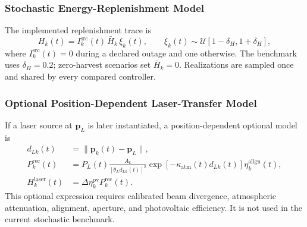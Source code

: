 \subsubsection{Stochastic Energy-Replenishment Model}
The implemented replenishment trace is
\begin{equation}
H_k(t)=I_k^{\mathrm{src}}(t)\,\bar H_k\,\xi_k(t),\qquad
\xi_k(t)\sim\mathcal U[1-\delta_H,1+\delta_H],
\label{eq:stochastic_harvest}
\end{equation}
where $I_k^{\mathrm{src}}(t)=0$ during a declared outage and one
otherwise. The benchmark uses $\delta_H=0.2$; zero-harvest scenarios
set $\bar H_k=0$. Realizations are sampled once and shared by every
compared controller.

\subsubsection{Optional Position-Dependent Laser-Transfer Model}
If a laser source at $\boldsymbol p_L$ is later instantiated, a
position-dependent optional model is
\begin{equation}
\begin{aligned}
d_{Lk}(t)&=\|\boldsymbol p_k(t)-\boldsymbol p_L\|,\\
P_k^{\mathrm{rec}}(t)&=
P_L(t)\frac{A_k}{[\theta_Ld_{Lk}(t)]^2}
\exp[-\kappa_{\mathrm{atm}}(t)d_{Lk}(t)]
\eta_k^{\mathrm{align}}(t),\\
H_k^{\mathrm{laser}}(t)&=\Delta\eta_k^{\mathrm{pv}}
P_k^{\mathrm{rec}}(t).
\end{aligned}
\label{eq:optional_laser}
\end{equation}
This optional expression requires calibrated beam divergence,
atmospheric attenuation, alignment, aperture, and photovoltaic
efficiency. It is not used in the current stochastic benchmark.

